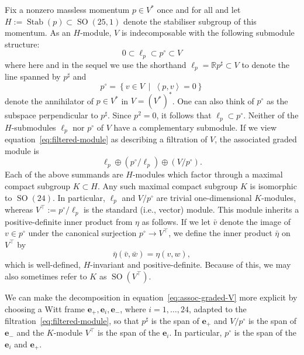 \documentclass[11pt,reqno,a4paper,final]{amsart}
\theoremstyle{plain}
\theoremstyle{definition}
\newcommand{\be}{\boldsymbol{e}}
\newcommand{\Stab}{\operatorname{Stab}}
\newcommand{\RR}{\mathbb{R}}
\newcommand{\1}{\mathbb{1}}
\newcommand{\SO}{\operatorname{SO}}
\numberwithin{equation}{section}
\begin{document}
Fix a nonzero massless momentum $p \in V^*$ once and for all and let
$H:=\Stab(p) \subset \SO(25,1)$ denote the stabiliser subgroup of this momentum.  
As an $H$-module, $V$ is indecomposable with the following submodule structure:
\begin{equation}
  \label{eq:filtered-module}
  0 \subset \ell_p \subset p^\circ \subset V
\end{equation}
where here and in the sequel we use the shorthand $\ell_p = \RR
p^\sharp \subset V$ to denote the line spanned by $p^\sharp$ and
\begin{equation}
  \label{eq:p-perp}
  p^\circ = \left\{v \in V~\middle |~ \left<p,v\right> = 0\right\}
\end{equation}
denote the annihilator of $p\in V^*$ in $V = (V^*)^*$.  One can also
think of $p^\circ$ as the subspace perpendicular to $p^\sharp$.  Since
$p^2 = 0$, it follows that $\ell_p \subset p^\circ$.  Neither of the
$H$-submodules $\ell_p$ nor $p^\circ$ of $V$ have a complementary
submodule. If we view equation~\eqref{eq:filtered-module} as
describing a filtration of $V$, the associated graded module is
\begin{equation}
  \label{eq:assoc-graded-V}
  \ell_p \oplus (p^\circ/\ell_p) \oplus (V/p^\circ).
\end{equation}
Each of the above summands are $H$-modules which factor through a
maximal compact subgroup $K \subset H$.  Any such maximal compact
subgroup $K$ is isomorphic to $\SO(24)$.  In particular, $\ell_p$ and
$V/p^\circ$ are trivial one-dimensional $K$-modules, whereas
$V^\top := p^\circ/\ell_p$ is the standard (i.e., vector) module.
This module inherits a positive-definite inner product from $\eta$ as 
follows.  If we let $\bar v$ denote the image of $v \in p^\circ$ under
the canonical surjection $p^\circ \to V^\top$, we define the inner
product $\bar\eta$ on $V^\top$ by
\begin{equation}
  \label{eq:euclidean-IP-on-V-transverse}
  \bar\eta (\bar v, \bar w) = \eta(v,w),
\end{equation}
which is well-defined, $H$-invariant and positive-definite.
Because of this, we may also sometimes refer to $K$ as $\SO(V^\top)$.

We can make the decomposition in equation~\eqref{eq:assoc-graded-V}
more explicit by choosing a Witt frame $\be_+,\be_i,\be_-$, where
$i =1,\dots,24$, adapted to the filtration~\eqref{eq:filtered-module},
so that $p^\sharp$ is the span of $\be_+$ and $V/p^\circ$ is the span
of $\be_-$ and the $K$-module $V^\top$ is the span of the $\be_i$.  In
particular, $p^\circ$ is the span of the $\be_i$ and $\be_+$.
\end{document}
